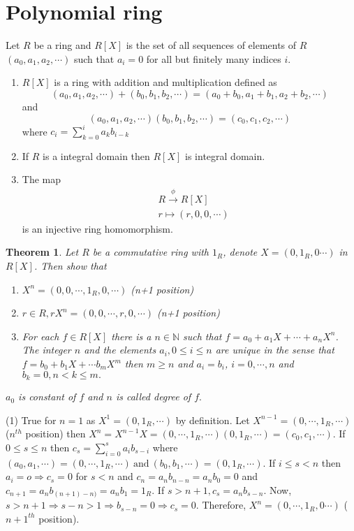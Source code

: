 \documentclass[11pt]{amsart}
\newtheorem{theorem}{Theorem}[section]
\newcommand{\NN}{\mathbb N}
\begin{document}
\section{Polynomial ring}
Let $R$ be a ring and $R[X]$ is the set of all sequences of elements of $R$ $(a_0,a_1,a_2,\cdots )$ such that $a_i=0$ for all but finitely many indices $i.$ 
\begin{enumerate}
\item $R[X]$ is a ring with addition and multiplication defined as $$(a_0,a_1,a_2,\cdots )+(b_0,b_1,b_2,\cdots )=(a_0+b_0,a_1+b_1,a_2+b_2,\cdots )$$ and $$(a_0,a_1,a_2,\cdots )(b_0,b_1,b_2,\cdots )=(c_0,c_1,c_2,\cdots )$$ where $c_i=\displaystyle\sum_{k=0}^i a_kb_{i-k}$
\item If $R$ is a integral domain then $R[X]$ is integral domain.
\item The map \begin{align*}
&R\stackrel{\phi}{\longrightarrow} R[X]\\
&r\mapsto (r,0,0,\cdots )
\end{align*} is an injective ring homomorphism.
\end{enumerate}
\begin{theorem}
Let $R$ be a commutative ring with $1_R$, denote $X=(0,1_R,0\cdots )$ in $R[X]$. Then show that \begin{enumerate}
\item $X^n=(0,0,\cdots ,1_R,0,\cdots )$ (n+1 position)
\item $r\in R, rX^n=(0,0,\cdots ,r,0,\cdots )$ (n+1 position)
\item For each $f\in R[X]$ there is a $n\in {\NN}$ such that $f=a_0+a_1X+\cdots +a_nX^n$. The integer $n$ and the elements $a_i, 0\leq i\leq n$ are unique in the sense that $f=b_0+b_1X+\cdots b_mX^m$ then $m\geq n$ and $a_i=b_i$, $i=0,\cdots ,n$ and $b_k=0, n<k\leq m.$
\end{enumerate}
$a_0$ is constant of $f$ and $n$ is called degree of $f.$
\end{theorem}
\proof (1) True for $n=1$ as $X^1=(0,1_R,\cdots )$ by definition. Let $X^{n-1}=(0,\cdots ,1_R,\cdots )$ ($n^{th}$ position) then $X^n=X^{n-1}X=(0,\cdots ,1_R,\cdots )(0,1_R,\cdots )=(c_0,c_1,\cdots )$. If $0\leq s\leq n$ then $c_s=\displaystyle\sum_{i=0}^s a_ib_{s-i}$ where $(a_0,a_1,\cdots )=(0,\cdots ,1_R,\cdots )~\text{and}~(b_0,b_1,\cdots )=(0,1_R,\cdots )$. If $i\leq s<n$ then $a_i=o \Rightarrow c_s=0$ for $s<n$ and $c_n=a_nb_{n-n}=a_nb_0=0$ and $c_{n+1}=a_nb_{(n+1)-n)}=a_nb_1=1_R.$ If $s>n+1, c_s=a_nb_{s-n}.$ Now, $s>n+1 \Rightarrow s-n>1 \Rightarrow b_{s-n}=0 \Rightarrow c_s=0$. Therefore, $X^n=(0,\cdots ,1_R,0\cdots )$ ($n+1^{th}$ position).\\
\end{document}
